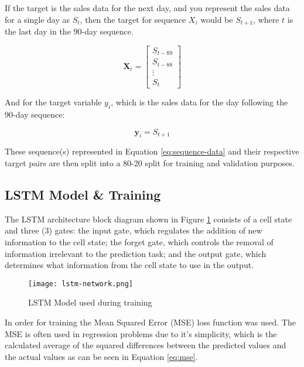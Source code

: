 \documentclass[10pt, conference, compsoc]{IEEEtran}
\begin{document}
If the target is the sales data for the next day, and you represent the sales data for a single day as $S_t$, then the target for sequence $X_i$ would be $S_{t+1}$, where $t$ is the last day in the 90-day sequence.

\begin{equation}
\mathbf{X}_i = \begin{bmatrix} 
S_{t-89} \\ 
S_{t-88} \\ 
\vdots \\ 
S_t 
\end{bmatrix}
\label{eq:sequence-matrix}
\end{equation}

And for the target variable $y_i$, which is the sales data for the day following the 90-day sequence:

\begin{equation}
\mathbf{y}_i = S_{t+1}
\label{eq:sequence-data}
\end{equation}

These sequence(s) represented in Equation \ref{eq:sequence-data} and their respective target pairs are then split into a 80-20 split for training and validation purposes.


\subsection{LSTM Model \& Training}
The LSTM architecture block diagram shown in Figure \ref{fig:lstm-model} consists of a cell state and three (3) gates: the input gate, which regulates the addition of new information to the cell state; the forget gate, which controls the removal of information irrelevant to the prediction task; and the output gate, which determines what information from the cell state to use in the output.

\begin{figure}[h]
\centering
\captionsetup{justification=centering,margin=1cm}
\texttt{[image: lstm-network.png]}
\caption{LSTM Model used during training}
\label{fig:lstm-model}
\end{figure}

In order for training the Mean Squared Error (MSE) loss function was used. The MSE is often used in regression problems\cite{improved-sales-forecasting} due to it's simplicity, which is the calculated average of the squared differences between the predicted values and the actual values as can be seen in Equation \ref{eq:mse}.
\end{document}
